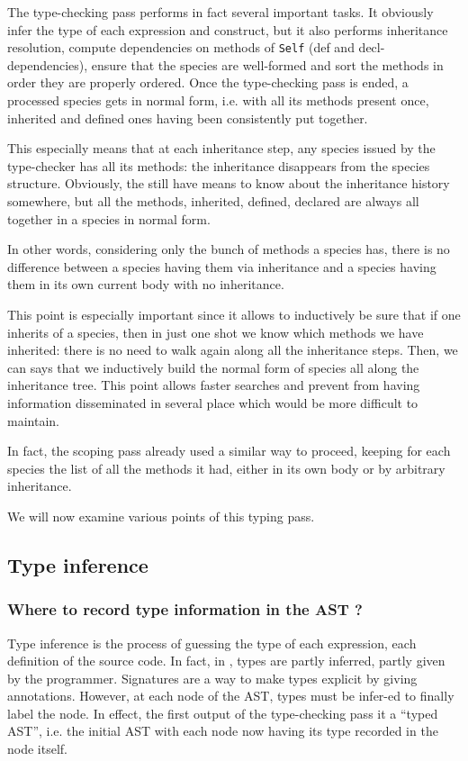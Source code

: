 
The type-checking pass performs in fact several important tasks. It
obviously infer the type of each expression and construct, but it also
performs inheritance resolution, compute dependencies on methods of
{\tt Self} (def and decl-dependencies), ensure that the species are
well-formed and sort the methods in order they are properly ordered.
Once the type-checking pass is ended, a processed species gets in
normal form, i.e. with all its methods present once, inherited and
defined ones having been consistently put together.

\label{cool-incremental-nf}
This especially means that at each inheritance step, any species
issued by the type-checker has all its methods: the inheritance
disappears from the species structure. Obviously, the still have means
to know about the inheritance history somewhere, but all the methods,
inherited, defined, declared are always all together in a species in
normal form.

In other words, considering only the bunch of methods a species has,
there is no difference between a species having them via inheritance
and a species having them in its own current body with no
inheritance.

This point is especially important since it allows to inductively be
sure that if one inherits of a species, then in just one shot we know
which methods we have inherited: there is no need to walk again along
all the inheritance steps. Then, we can says that we inductively build
the normal form of species all along the inheritance tree. This point
allows faster searches and prevent from having information
disseminated in several place which would be more difficult to
maintain.

In fact, the scoping pass already used a similar way to proceed,
keeping for each species the list of all the methods it had, either in
its own body or by arbitrary inheritance.

\medskip
We will now examine various points of this typing pass.




\subsection{Type inference}
\subsubsection{Where to record type information in the AST ?}
Type inference is the process of guessing the type of each expression,
each definition of the source code. In fact, in \focalize, types are
partly inferred, partly given by the programmer. Signatures are a way
to make types explicit by giving annotations. However, at each node of
the AST, types must be infer-ed to finally label the node. In effect,
the first output of the type-checking pass it a ``typed AST'',
i.e. the initial AST with each node now having its type recorded in
the node itself.

